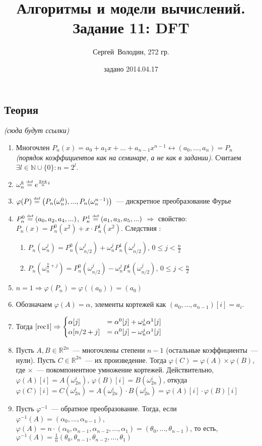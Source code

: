 \documentclass[a4paper]{article}
\date{задано 2014.04.17}
\author{Сергей~Володин, 272 гр.}
\title{Алгоритмы и модели вычислений.\\Задание 11: DFT}
\def\eqdef{\overset{\mbox{\tiny def}}{=}}
\newcommand{\NN}{\mathbb{N}}
\newcommand{\RR}{\mathbb{R}}
\begin{document}
\maketitle
\subsection*{Теория}
{\em(сюда будут ссылки)}
\begin{enumerate}
\item Многочлен $P_n(x)=a_0+a_1x+...+a_{n-1}x^{n-1}\longleftrightarrow (a_0,...,a_n)=P_n$ {\em (порядок коэффициентов как на семинаре, а не как в задании)}. Считаем $\exists l\in\NN\cup\{0\}\colon n=2^l$.
\item $\omega_n^k\eqdef e^{\frac{2\pi k}{n}i}$
\item $\varphi(P)\eqdef \big(P_n(\omega_n^0),...,P_n(\omega_n^{n-1})\big)$~--- дискретное преобразование Фурье
\item $P_n^0\eqdef (a_0,a_2,a_4,...)$, $P_n^1\eqdef (a_1,a_3,a_5,...)$ $\Rightarrow$ свойство: $P_n(x)=P^0_n(x^2)+x\cdot P^1_n(x^2)$. Следствия \label{rec1}:\begin{enumerate}
\item $P_n(\omega_n^j)=P_n^0(\omega_{n/2}^j)+\omega_n^j P_n^1(\omega_{n/2}^j)$, $0\leqslant j<\frac{n}{2}$
\item $P_n(\omega_n^{\frac{n}{2}+j})=P_n^0(\omega_{n/2}^j)- \omega_n^jP_n^1(\omega_{n/2}^j)$, $0\leqslant j < \frac{n}{2}$
\end{enumerate}
\item \label{n1} $n=1\Rightarrow \varphi(P_n)=\varphi((a_0))=(a_0)$ 
\item Обозначаем $\varphi(A)=\alpha$, элементы кортежей как $(a_0,...,a_{n-1})[i]=a_i$.
\item Тогда $\ref{rec1}\Rightarrow\begin{cases}
\alpha[j]&=\alpha^0[j]+\omega_n^j\alpha^1[j]\\
\alpha[n/2+j]&=\alpha^0[j]-\omega_n^j\alpha^1[j]
\end{cases}$
\item \label{mult} Пусть $A,B\in\RR^{2n}$~--- многочлены степени $n-1$ (остальные коэффициенты~--- нули). Пусть $C\in\RR^{2n}$~--- их произведение. Тогда $\varphi(C)=\varphi(A)\times\varphi(B)$, где $\times$~--- покомпонентное умножение кортежей. Действительно, $\varphi(A)[i]=A(\omega_{2n}^i)$, $\varphi(B)[i]=B(\omega_{2n}^i)$, откуда $\varphi(C)[i]=C(\omega_{2n}^i)=A(\omega_{2n}^i)\cdot B(\omega_{2n}^i)=\varphi(A)[i]\cdot\varphi(B)[i]$
\item \label{inverse} Пусть $\varphi^{-1}$~--- обратное преобразование. Тогда, если $\varphi^{-1}(A)=(\alpha_0,...,\alpha_{n-1})$, $\varphi(A)=n\cdot(\alpha_0,\alpha_{n-1},\alpha_{n-2},...,\alpha_1)=(\theta_0,...,\theta_{n-1})$, то есть, $\varphi^{-1}(A)=\frac{1}{n}(\theta_0,\theta_{n-1},\theta_{n-2},...,\theta_1)$
\end{enumerate}
\end{document}
